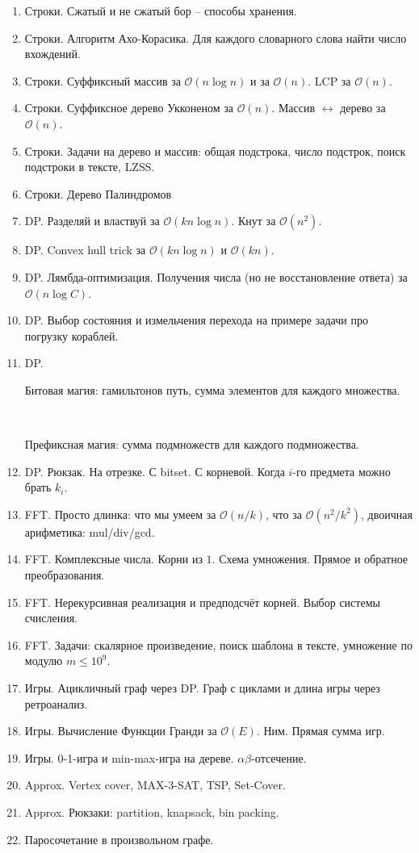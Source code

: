 \documentclass[11pt]{article}
\def\O{\mathcal{O}}      %
\newcounter{myenumi}
\newenvironment{MyList}{
  \begin{enumerate}[1.]
  \setlength{\parskip}{0pt}
  \setlength{\itemsep}{2pt}
  \setcounter{enumi}{\arabic{myenumi}}
}{
  \setcounter{myenumi}{\arabic{enumi}}
  \end{enumerate}
}
\begin{document}
\begin{MyList}
\item Строки. Сжатый и не сжатый бор -- способы хранения. 
\item Строки. Алгоритм Ахо-Корасика. Для каждого словарного слова найти число вхождений.
\item Строки. Суффиксный массив за $\O(n \log n)$ и за $\O(n)$. LCP за $\O(n)$.
\item Строки. Суффиксное дерево Укконеном за $\O(n)$. Массив $\leftrightarrow$ дерево за $\O(n)$.
\item Строки. Задачи на дерево и массив: общая подстрока, число подстрок, поиск подстроки в тексте, LZSS.
\item Строки. Дерево Палиндромов
\item DP. Разделяй и властвуй за $\O(k n \log n)$. Кнут за $\O(n^2)$.
\item DP. Convex hull trick за $\O(k n \log n)$ и $\O(k n)$.
\item DP. Лямбда-оптимизация. Получения числа (но не восстановление ответа) за $\O(n \log C)$.
\item DP. Выбор состояния и измельчения перехода на примере задачи про погрузку кораблей.
\item \parbox{0.6cm}{DP.} Битовая магия: гамильтонов путь, сумма элементов для каждого множества.\\ 
      \parbox{0.6cm}{\ } Префиксная магия: сумма подмножеств для каждого подмножества.
\item DP. Рюкзак. На отрезке. С bitset. С корневой. Когда $i$-го предмета можно брать $k_i$.
\item FFT. Просто длинка: что мы умеем за $\O(n/k)$, что за $\O(n^2/k^2)$, двоичная арифметика: mul/div/gcd.
\item FFT. Комплексные числа. Корни из $1$. Схема умножения. Прямое и обратное преобразования.
\item FFT. Нерекурсивная реализация и предподсчёт корней. Выбор системы счисления.
\item FFT. Задачи: скалярное произведение, поиск шаблона в тексте, умножение по модулю $m \le 10^9$.
\item Игры. Ацикличный граф через DP. Граф с циклами и длина игры через ретроанализ.
\item Игры. Вычисление Функции Гранди за $\O(E)$. Ним. Прямая сумма игр.
\item Игры. 0-1-игра и min-max-игра на дереве. $\alpha\beta$-отсечение.
\item Approx. Vertex cover, MAX-3-SAT, TSP, Set-Cover.
\item Approx. Рюкзаки: partition, knapsack, bin packing.
\item Паросочетание в произвольном графе.
\end{MyList}
\end{document}
